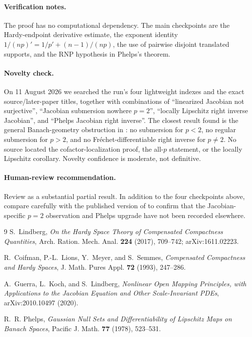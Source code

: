 \documentclass[11pt]{article}
\theoremstyle{remark}
\begin{document}
\paragraph{Verification notes.}
The proof has no computational dependency.  The main checkpoints are the
Hardy-endpoint derivative estimate, the exponent identity
$1/(np)'=1/p'+(n-1)/(np)$, the use of pairwise disjoint translated supports,
and the RNP hypothesis in Phelps's theorem.

\paragraph{Novelty check.}
On 11 August 2026 we searched the run's four lightweight indexes and the exact
source/later-paper titles, together with combinations of ``linearized
Jacobian not surjective'', ``Jacobian submersion nowhere $p=2$'', ``locally
Lipschitz right inverse Jacobian'', and ``Phelps Jacobian right inverse''.
The closest result found is the general Banach-geometry obstruction in
\cite{GKL}: no submersion for $p<2$, no regular submersion for $p>2$, and no
Fr\'echet-differentiable right inverse for $p\ne2$.  No source located the
cofactor-localization proof, the all-$p$ statement, or the locally Lipschitz
corollary.  Novelty confidence is moderate, not definitive.

\paragraph{Human-review recommendation.}
Review as a substantial partial result.  In addition to the four checkpoints
above, compare carefully with the published version of \cite{GKL} to confirm
that the Jacobian-specific $p=2$ observation and Phelps upgrade have not been
recorded elsewhere.

\begin{thebibliography}{9}
S.~Lindberg,
\emph{On the Hardy Space Theory of Compensated Compactness Quantities},
Arch. Ration. Mech. Anal. \textbf{224} (2017), 709--742;
arXiv:1611.02223.

R.~Coifman, P.-L.~Lions, Y.~Meyer, and S.~Semmes,
\emph{Compensated Compactness and Hardy Spaces},
J. Math. Pures Appl. \textbf{72} (1993), 247--286.

A.~Guerra, L.~Koch, and S.~Lindberg,
\emph{Nonlinear Open Mapping Principles, with Applications to the Jacobian
Equation and Other Scale-Invariant PDEs},
arXiv:2010.10497 (2020).

R.~R. Phelps,
\emph{Gaussian Null Sets and Differentiability of Lipschitz Maps on Banach
Spaces},
Pacific J. Math. \textbf{77} (1978), 523--531.
\end{thebibliography}
\end{document}
